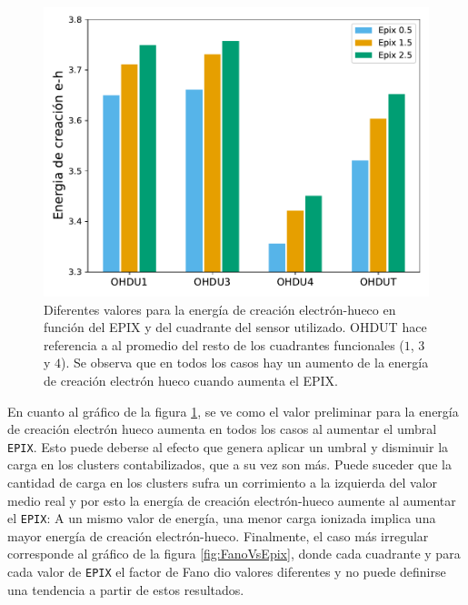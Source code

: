 \begin{figure}[h]
    \centering
    \includegraphics[scale=0.5]{Figs/EnergiaCreacion_vs_Epix.pdf}
    \caption{\footnotesize{Diferentes valores para la energía de creación electrón-hueco en función del EPIX y del cuadrante del sensor utilizado. OHDUT hace referencia a al promedio del resto de los cuadrantes funcionales ($1$, $3$ y $4$). Se observa que en todos los casos hay un aumento de la energía de creación electrón hueco cuando aumenta el EPIX.}}
    \label{fig:EnergiadeCreacionVsEpix}
\end{figure}
En cuanto al gráfico de la figura \ref{fig:EnergiadeCreacionVsEpix}, se ve como el valor preliminar para la energía de creación electrón hueco aumenta en todos los casos al aumentar el umbral \verb|EPIX|. Esto puede deberse al efecto que genera aplicar un umbral y disminuir la carga en los clusters contabilizados, que a su vez son más. Puede suceder que la cantidad de carga en los clusters sufra un corrimiento a la izquierda del valor medio real y por esto la energía de creación electrón-hueco aumente al aumentar el \verb|EPIX|: A un mismo valor de energía, una menor carga ionizada implica una mayor energía de creación electrón-hueco.
Finalmente, el caso más irregular corresponde al gráfico de la figura \ref{fig:FanoVsEpix}, donde cada cuadrante y para cada valor de \verb|EPIX| el factor de Fano dio valores diferentes y no puede definirse una tendencia a partir de estos resultados.
